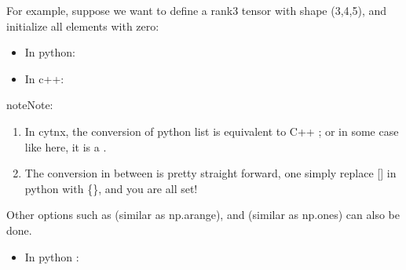 \documentclass[letterpaper,10pt,english]{sphinxmanual}
\begin{document}
For example, suppose we want to define a rank\sphinxhyphen{}3 tensor with shape (3,4,5), and initialize all elements with zero:
\begin{itemize}
\item {} 
In python:

\end{itemize}

\begin{sphinxVerbatim}[commandchars=\\\{\},numbers=left,firstnumber=1,stepnumber=1]
  \PYG{p}{[}\PYG{p}{]}
\end{sphinxVerbatim}
\begin{itemize}
\item {} 
In c++:

\end{itemize}

\begin{sphinxVerbatim}[commandchars=\\\{\},numbers=left,firstnumber=1,stepnumber=1]
   
\end{sphinxVerbatim}

\begin{sphinxadmonition}{note}{Note:}\begin{enumerate}
%
\item {} 
In cytnx, the conversion of python list is equivalent to C++ ; or in some case like here, it is a .

\item {} 
The conversion in between is pretty straight forward, one simply replace {[}{]} in python with \{\}, and you are all set!

\end{enumerate}
\end{sphinxadmonition}

Other options such as  (similar as np.arange), and  (similar as np.ones) can also be done.
\begin{itemize}
\item {} 
In python :

\end{itemize}
\end{document}

